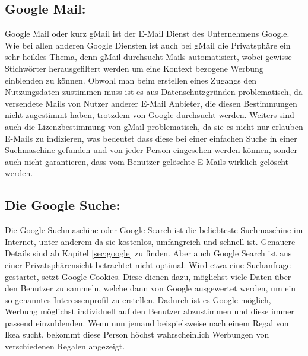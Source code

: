 \documentclass[12pt, a4paper]{llncs}
\begin{document}
	\subsection{Google Mail:}
	Google Mail oder kurz gMail ist der E-Mail Dienst des Unternehmens Google. Wie bei allen anderen Google Diensten ist auch bei gMail die Privatsphäre ein sehr heikles Thema, denn gMail durchsucht Mails automatisiert, wobei gewisse Stichwörter herausgefiltert werden um eine Kontext bezogene Werbung einblenden zu können. Obwohl man beim erstellen eines Zugangs den Nutzungsdaten zustimmen muss ist es aus Datenschutzgründen problematisch, da versendete Mails von Nutzer anderer E-Mail Anbieter, die diesen Bestimmungen nicht zugestimmt haben, trotzdem von Google durchsucht werden. Weiters sind auch die Lizenzbestimmung von gMail problematisch, da sie es nicht nur erlauben E-Mails zu indizieren, was bedeutet dass diese bei einer einfachen Suche in einer Suchmaschine gefunden und von jeder Person eingesehen werden können, sonder auch nicht garantieren, dass vom Benutzer gelöschte E-Mails wirklich gelöscht werden.
	
	\subsection{Die Google Suche:}
	\label{sec:search}
	Die Google Suchmaschine oder Google Search ist die beliebteste Suchmaschine im Internet, unter anderem da sie kostenlos, umfangreich und schnell ist. Genauere Details sind ab Kapitel \ref{sec:google} zu finden. Aber auch Google Search ist aus einer Privatsphärensicht betrachtet nicht optimal. Wird etwa eine Suchanfrage gestartet, setzt Google Cookies. Diese dienen dazu, möglichst viele Daten über den Benutzer zu sammeln, welche dann von Google ausgewertet werden, um ein so genanntes Interessenprofil zu erstellen. Dadurch ist es Google möglich, Werbung möglichst individuell auf den Benutzer abzustimmen und diese immer passend einzublenden. Wenn nun jemand beispielsweise nach einem Regal von Ikea sucht, bekommt diese Person höchst wahrscheinlich Werbungen von verschiedenen Regalen angezeigt\cite{3}.
\end{document}
